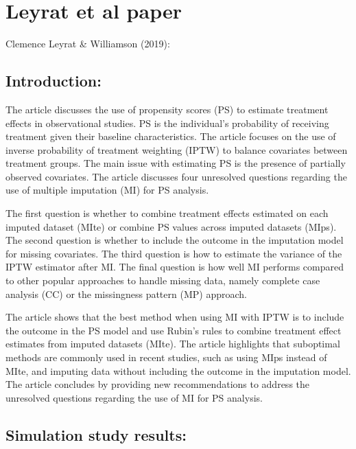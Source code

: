 \documentclass{article}
\begin{document}
\hypertarget{leyrat-et-al-paper}{%
\section{Leyrat et al paper}\label{leyrat-et-al-paper}}

Clemence Leyrat \& Williamson (2019):

\hypertarget{introduction-1}{%
\subsection{Introduction:}\label{introduction-1}}

The article discusses the use of propensity scores (PS) to estimate
treatment effects in observational studies. PS is the individual's
probability of receiving treatment given their baseline characteristics.
The article focuses on the use of inverse probability of treatment
weighting (IPTW) to balance covariates between treatment groups. The
main issue with estimating PS is the presence of partially observed
covariates. The article discusses four unresolved questions regarding
the use of multiple imputation (MI) for PS analysis.

The first question is whether to combine treatment effects estimated on
each imputed dataset (MIte) or combine PS values across imputed datasets
(MIps). The second question is whether to include the outcome in the
imputation model for missing covariates. The third question is how to
estimate the variance of the IPTW estimator after MI. The final question
is how well MI performs compared to other popular approaches to handle
missing data, namely complete case analysis (CC) or the missingness
pattern (MP) approach.

The article shows that the best method when using MI with IPTW is to
include the outcome in the PS model and use Rubin's rules to combine
treatment effect estimates from imputed datasets (MIte). The article
highlights that suboptimal methods are commonly used in recent studies,
such as using MIps instead of MIte, and imputing data without including
the outcome in the imputation model. The article concludes by providing
new recommendations to address the unresolved questions regarding the
use of MI for PS analysis.

\hypertarget{simulation-study-results}{%
\subsection{Simulation study results:}\label{simulation-study-results}}
\end{document}
